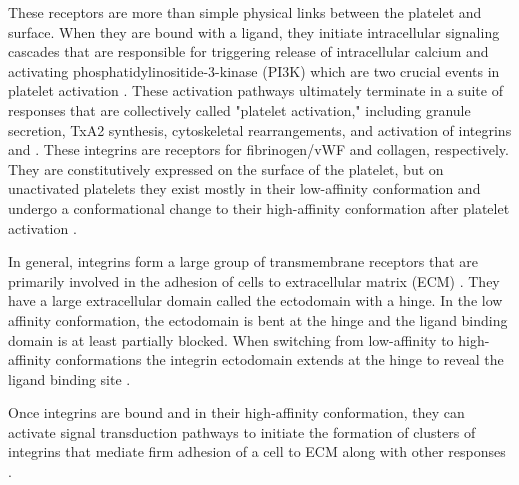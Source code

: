 These receptors are more than simple physical links between the
platelet and surface. When they are bound with a ligand, they initiate
intracellular signaling cascades that are responsible for triggering
release of intracellular calcium and activating
phosphatidylinositide-3-kinase (PI3K) which are two crucial events in
platelet activation \cite{Bye2016,Du2007,Senis2014}. These activation
pathways ultimately terminate in a suite of responses that are
collectively called "platelet activation," including granule
secretion, TxA2 synthesis, cytoskeletal rearrangements, and activation
of integrins  and . These integrins are
receptors for fibrinogen/vWF and collagen, respectively. They are
constitutively expressed on the surface of the platelet, but on
unactivated platelets they exist mostly in their low-affinity
conformation and undergo a conformational change to their
high-affinity conformation after platelet activation
\cite{Qiu2015,Shattil1998,Shattil2010}.
		
In general, integrins form a large group of transmembrane receptors
that are primarily involved in the adhesion of cells to extracellular
matrix (ECM) \cite{Giancotti1999}. They have a large extracellular
domain called the ectodomain with a hinge. In the low affinity
conformation, the ectodomain is bent at the hinge and the ligand
binding domain is at least partially blocked. When switching from
low-affinity to high-affinity conformations the integrin ectodomain
extends at the hinge to reveal the ligand binding site
\cite{Campbell2011,Qiu2015,Shattil1998}.
		
Once integrins are bound and in their high-affinity conformation, they
can activate signal transduction pathways to initiate the formation of
clusters of integrins that mediate firm adhesion of a cell to ECM
along with other responses \cite{Hynes2002,Li2010,Shattil1998,Shattil2010}.
	


